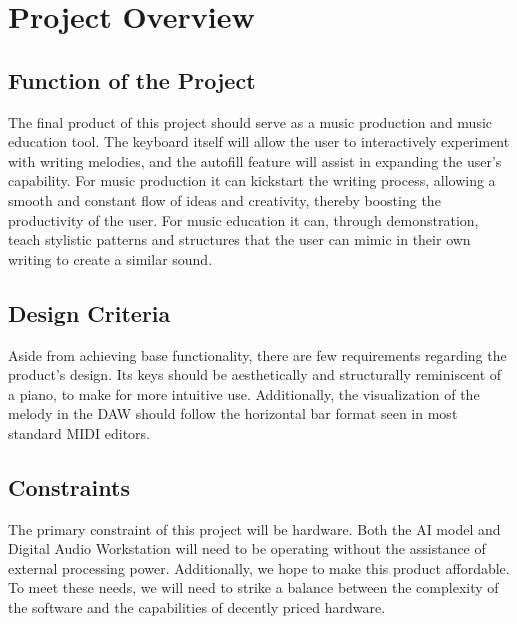\section{Project Overview}
\subsection{Function of the Project}

The final product of this project should serve as a music production and music
education tool. The keyboard itself will allow the user to interactively experiment with
writing melodies, and the autofill feature will assist in expanding the user’s capability.
For music production it can kickstart the writing process, allowing a smooth and
constant flow of ideas and creativity, thereby boosting the productivity of the user.
For music education it can, through demonstration, teach stylistic patterns and
structures that the user can mimic in their own writing to create a similar sound.


\subsection{Design Criteria}

Aside from achieving base functionality, there are few requirements regarding the
product’s design. Its keys should be aesthetically and structurally reminiscent of a
piano, to make for more intuitive use. Additionally, the visualization of the melody in
the DAW should follow the horizontal bar format seen in most standard MIDI editors.

\subsection{Constraints}

The primary constraint of this project will be hardware. Both the AI model and Digital
Audio Workstation will need to be operating without the assistance of external
processing power. Additionally, we hope to make this product affordable. To meet
these needs, we will need to strike a balance between the complexity of the software
and the capabilities of decently priced hardware.




